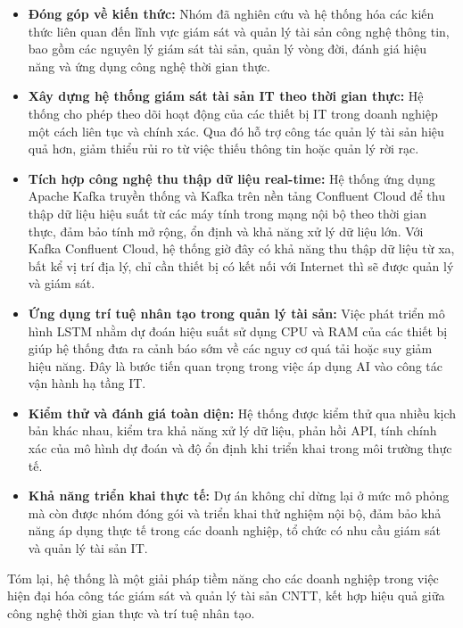 \begin{itemize}[label=--]
    \item \textbf{Đóng góp về kiến thức:} Nhóm đã nghiên cứu và hệ thống hóa các kiến thức liên quan đến lĩnh vực giám sát và quản lý tài sản công nghệ thông tin, bao gồm các nguyên lý giám sát tài sản, quản lý vòng đời, đánh giá hiệu năng và ứng dụng công nghệ thời gian thực.
    
    \item \textbf{Xây dựng hệ thống giám sát tài sản IT theo thời gian thực:} Hệ thống cho phép theo dõi hoạt động của các thiết bị IT trong doanh nghiệp một cách liên tục và chính xác. Qua đó hỗ trợ công tác quản lý tài sản hiệu quả hơn, giảm thiểu rủi ro từ việc thiếu thông tin hoặc quản lý rời rạc.

    \item \textbf{Tích hợp công nghệ thu thập dữ liệu real-time:} Hệ thống ứng dụng Apache Kafka truyền thống và Kafka trên nền tảng Confluent Cloud để thu thập dữ liệu hiệu suất từ các máy tính trong mạng nội bộ theo thời gian thực, đảm bảo tính mở rộng, ổn định và khả năng xử lý dữ liệu lớn. Với Kafka Confluent Cloud, hệ thống giờ đây có khả năng thu thập dữ liệu từ xa, bất kể vị trí địa lý, chỉ cần thiết bị có kết nối với Internet thì sẽ được quản lý và giám sát.

    \item \textbf{Ứng dụng trí tuệ nhân tạo trong quản lý tài sản:} Việc phát triển mô hình LSTM nhằm dự đoán hiệu suất sử dụng CPU và RAM của các thiết bị giúp hệ thống đưa ra cảnh báo sớm về các nguy cơ quá tải hoặc suy giảm hiệu năng. Đây là bước tiến quan trọng trong việc áp dụng AI vào công tác vận hành hạ tầng IT.

    \item \textbf{Kiểm thử và đánh giá toàn diện:} Hệ thống được kiểm thử qua nhiều kịch bản khác nhau, kiểm tra khả năng xử lý dữ liệu, phản hồi API, tính chính xác của mô hình dự đoán và độ ổn định khi triển khai trong môi trường thực tế.

    \item \textbf{Khả năng triển khai thực tế:} Dự án không chỉ dừng lại ở mức mô phỏng mà còn được nhóm đóng gói và triển khai thử nghiệm nội bộ, đảm bảo khả năng áp dụng thực tế trong các doanh nghiệp, tổ chức có nhu cầu giám sát và quản lý tài sản IT.

\end{itemize}

\noindent Tóm lại, hệ thống là một giải pháp tiềm năng cho các doanh nghiệp trong việc hiện đại hóa công tác giám sát và quản lý tài sản CNTT, kết hợp hiệu quả giữa công nghệ thời gian thực và trí tuệ nhân tạo.

